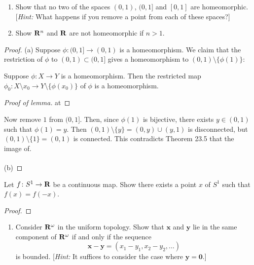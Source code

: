 \newpage
\begin{problem}[Munkres \S24, Ex.\,1(ac)]
\begin{enumerate}[noitemsep]
\item[(a)] Show that no two of the spaces $(0,1)$, $(0,1]$ and
  $[0,1]$ are homeomorphic. [\emph{Hint:} What happens if you
  remove a point from each of these spaces?]
\item[(c)] Show $\mathbf{R}^n$ and $\mathbf{R}$ are not homeomorphic if $n>1$.
\end{enumerate}
\end{problem}
\begin{proof}
(a) Suppose $\phi\colon (0,1]\to (0,1)$ is a homeomorphism. We
claim that the restriction of $\phi$ to $(0,1)\subset(0,1]$ gives
a homeomorphism to $(0,1)\setminus\{\phi(1)\}$:
\begin{lemma}
Suppose $\phi\colon X\to Y$ is a homeomorphism. Then the
restricted map $\phi_0\colon X\setminus{x_0}\to
Y\setminus\{\phi(x_0)\}$ of $\phi$ is a homeomorphism.
\end{lemma}
\begin{proof}[Proof of lemma]
\renewcommand\qedsymbol{$\clubsuit$}
at
\end{proof}
Now remove $1$ from $(0,1]$. Then, since $\phi(1)$ is bijective,
there exists $y\in(0,1)$ such that $\phi(1)=y$. Then
$(0,1)\setminus\{y\}=(0,y)\cup(y,1)$ is disconnected, but
$(0,1)\setminus\{1\}=(0,1)$ is connected. This contradicts
Theorem 23.5 that the image of.
\\\\
(b)
\end{proof}
\newpage
\begin{problem}[Munkres \S24, Ex.\,2]
Let $f\colon S^1\to\mathbf{R}$ be a continuous map. Show there exists a
point $x$ of $S^1$ such that $f(x)=f(-x)$.
\end{problem}
\begin{proof}
\end{proof}
\newpage
\begin{problem}[Munkres \S25, Ex.\,2(b)]
\begin{enumerate}[noitemsep]
\item[(b)] Consider $\mathbf{R}^\omega$ in the uniform topology. Show
  that $\mathbf{x}$ and $\mathbf{y}$ lie in the same component of
  $\mathbf{R}^\omega$ if and only if the sequence
  \[
    \mathbf{x}-\mathbf{y}=(x_1-y_1,x_2-y_2,...)
  \]
  is bounded. [\emph{Hint:} It suffices to consider the case
  where $\mathbf{y}=\mathbf{0}$.]
\end{enumerate}
\end{problem}
